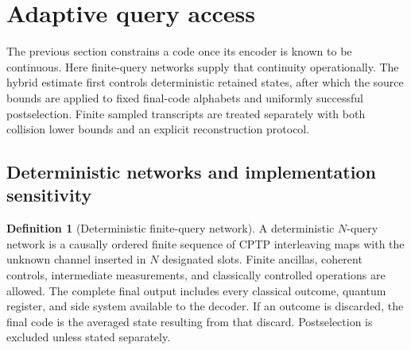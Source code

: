 \documentclass[11pt,a4paper]{article}
\theoremstyle{definition}
\newtheorem{definition}{Definition}[section]
\theoremstyle{plain}
\theoremstyle{remark}
\begin{document}
\section{Adaptive query access}
\label{sec:adaptive}

The previous section constrains a code once its encoder is known to be
continuous. Here finite-query networks supply that continuity
operationally. The hybrid estimate first controls deterministic retained
states, after which the source bounds are applied to fixed final-code
alphabets and uniformly successful postselection. Finite sampled transcripts
are treated separately with both collision lower bounds and an explicit
reconstruction protocol.

\subsection{Deterministic networks and implementation sensitivity}

\begin{definition}[Deterministic finite-query network]
A deterministic $N$-query network is a causally ordered finite sequence of
CPTP interleaving maps with the unknown channel inserted in $N$ designated
slots. Finite ancillas, coherent controls, intermediate measurements, and
classically controlled operations are allowed. The complete final output
includes every classical outcome, quantum register, and side system available
to the decoder. If an outcome is discarded, the final code is the averaged
state resulting from that discard. Postselection is excluded unless stated
separately.
\end{definition}
\end{document}
